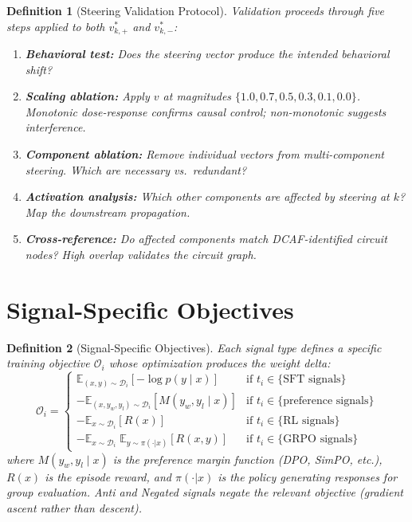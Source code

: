\documentclass[11pt]{article}
\newtheorem{definition}{Definition}[section]
\begin{document}
\begin{definition}[Steering Validation Protocol]
Validation proceeds through five steps applied to both $v^*_{k,+}$ and $v^*_{k,-}$:
\begin{enumerate}[nosep]
\item \textbf{Behavioral test:} Does the steering vector produce the intended behavioral shift?
\item \textbf{Scaling ablation:} Apply $v$ at magnitudes $\{1.0, 0.7, 0.5, 0.3, 0.1, 0.0\}$. Monotonic dose-response confirms causal control; non-monotonic suggests interference.
\item \textbf{Component ablation:} Remove individual vectors from multi-component steering. Which are necessary vs.\ redundant?
\item \textbf{Activation analysis:} Which other components are affected by steering at $k$? Map the downstream propagation.
\item \textbf{Cross-reference:} Do affected components match DCAF-identified circuit nodes? High overlap validates the circuit graph.
\end{enumerate}
\end{definition}

\section{Signal-Specific Objectives}
\label{app:signal-objectives}

\begin{definition}[Signal-Specific Objectives]
Each signal type defines a specific training objective $\mathcal{O}_i$ whose optimization produces the weight delta:
\begin{equation}
\mathcal{O}_i = \begin{cases}
\mathbb{E}_{(x,y) \sim \mathcal{D}_i}\left[-\log p(y \mid x)\right] & \text{if } t_i \in \{\text{SFT signals}\} \\[0.5em]
-\mathbb{E}_{(x,y_w,y_l) \sim \mathcal{D}_i}\left[M(y_w, y_l \mid x)\right] & \text{if } t_i \in \{\text{preference signals}\} \\[0.5em]
-\mathbb{E}_{x \sim \mathcal{D}_i}\left[R(x)\right] & \text{if } t_i \in \{\text{RL signals}\} \\[0.5em]
-\mathbb{E}_{x \sim \mathcal{D}_i}\;\mathbb{E}_{y \sim \pi(\cdot|x)}\left[R(x,y)\right] & \text{if } t_i \in \{\text{GRPO signals}\}
\end{cases}
\end{equation}
where $M(y_w, y_l \mid x)$ is the preference margin function (DPO, SimPO, etc.), $R(x)$ is the episode reward, and $\pi(\cdot|x)$ is the policy generating responses for group evaluation. Anti and Negated signals negate the relevant objective (gradient ascent rather than descent).
\end{definition}
\end{document}
